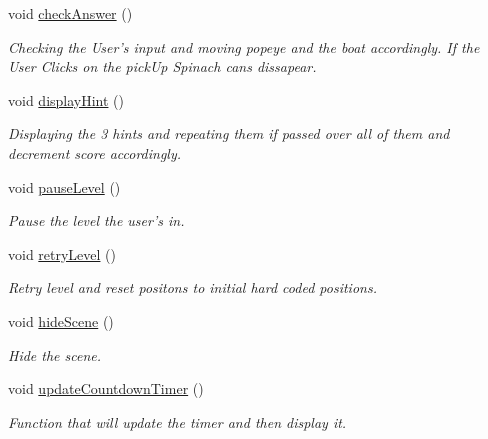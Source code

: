 \begin{DoxyCompactItemize}
\item 
void \hyperlink{classlevelsscene_afb0be60e25586a4c1f4f2c95d8687939}{check\-Answer} ()
\begin{DoxyCompactList}\small\item\em Checking the User's input and moving popeye and the boat accordingly. If the User Clicks on the pick\-Up Spinach cans dissapear. \end{DoxyCompactList}\item 
\hypertarget{classlevelsscene_a2b34314b18b5c7af96a2ba6bb9d74616}{void \hyperlink{classlevelsscene_a2b34314b18b5c7af96a2ba6bb9d74616}{display\-Hint} ()}\label{classlevelsscene_a2b34314b18b5c7af96a2ba6bb9d74616}

\begin{DoxyCompactList}\small\item\em Displaying the 3 hints and repeating them if passed over all of them and decrement score accordingly. \end{DoxyCompactList}\item 
void \hyperlink{classlevelsscene_ae6427d1e5f4207e87dab83a4f9ec6302}{pause\-Level} ()
\begin{DoxyCompactList}\small\item\em Pause the level the user's in. \end{DoxyCompactList}\item 
void \hyperlink{classlevelsscene_a9eb73af70c2c3030be31ba44b5966d20}{retry\-Level} ()
\begin{DoxyCompactList}\small\item\em Retry level and reset positons to initial hard coded positions. \end{DoxyCompactList}\item 
void \hyperlink{classlevelsscene_ab224af4c9e09ba73a8f38345643978b9}{hide\-Scene} ()
\begin{DoxyCompactList}\small\item\em Hide the scene. \end{DoxyCompactList}\item 
void \hyperlink{classlevelsscene_a3fc9fb8b563863ca1f73109a7f94dbba}{update\-Countdown\-Timer} ()
\begin{DoxyCompactList}\small\item\em Function that will update the timer and then display it. \end{DoxyCompactList}\end{DoxyCompactItemize}
